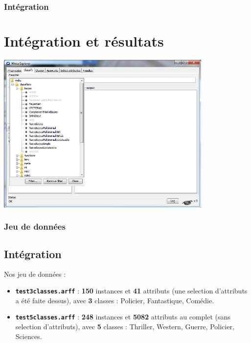 \documentclass[12pt]{beamer}
\begin{document}
\begin{frame}
\frametitle{Intégration}
\section{Intégration et résultats}
\begin{center}
\includegraphics[width=0.80\textwidth]{wekaAlgos}~\\[1cm]  
\end{center}


\end{frame}

\begin{frame}
\frametitle{Jeu de données}
\subsection{Intégration}
Nos jeu de données : 
\begin{itemize}
\item \texttt{\textbf{test3classes.arff}} : \textbf{150} instances et \textbf{41} attributs (une selection d'attributs a été faite dessus), avec \textbf{3} classes : Policier, Fantastique, Comédie.
\item \texttt{\textbf{test5classes.arff}} : \textbf{248} instances et \textbf{5082} attributs au complet (sans selection d'attributs), avec \textbf{5} classes : Thriller, Western, Guerre, Policier, Sciences.
\end{itemize}


\end{frame}
\end{document}
